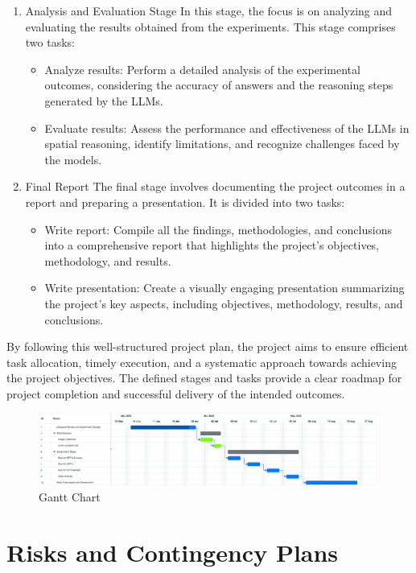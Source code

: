 \documentclass[journal,10pt]{IEEEtran}
\begin{document}
\begin{enumerate}
\begin{itemize}
    \end{itemize}
    \item Analysis and Evaluation Stage
    \subitem In this stage, the focus is on analyzing and evaluating the results obtained from the experiments. This stage comprises two tasks:
    \begin{itemize}
        \item Analyze results: Perform a detailed analysis of the experimental outcomes, considering the accuracy of answers and the reasoning steps generated by the LLMs.
        \item Evaluate results: Assess the performance and effectiveness of the LLMs in spatial reasoning, identify limitations, and recognize challenges faced by the models.
    \end{itemize}
    \item Final Report
    \subitem The final stage involves documenting the project outcomes in a report and preparing a presentation. It is divided into two tasks:
    \begin{itemize}
        \item Write report: Compile all the findings, methodologies, and conclusions into a comprehensive report that highlights the project's objectives, methodology, and results.
        \item Write presentation: Create a visually engaging presentation summarizing the project's key aspects, including objectives, methodology, results, and conclusions.
    \end{itemize}
\end{enumerate}

By following this well-structured project plan, the project aims to ensure efficient task allocation, timely execution, and a systematic approach towards achieving the project objectives. The defined stages and tasks provide a clear roadmap for project completion and successful delivery of the intended outcomes.

\begin{figure}[htp]
    \centering
    \includegraphics[width=0.8\linewidth]{./pic/Gnatt.png}
    \caption{Gantt Chart}
    \label{fig:gantt}
\end{figure}


\newpage
\section{Risks and Contingency Plans}



\end{document}
